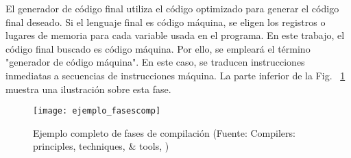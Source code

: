     El generador de código final utiliza el código optimizado para generar el código final deseado.
    Si el lenguaje final es código máquina, se eligen los registros o lugares de memoria para
    cada variable usada en el programa. 
    En este trabajo, el código final buscado es código máquina. Por ello, se empleará el término "generador de código máquina".
    En este caso, se traducen instrucciones inmediatas a secuencias de instrucciones máquina.
    La parte inferior de la Fig. ~\ref{fig:fasesEjemplo} muestra una ilustración sobre esta fase.

    \begin{figure}[p]
        \begingroup
            \centering
                \texttt{[image: ejemplo\_fasescomp]}
                \caption{Ejemplo completo de fases de compilación (Fuente: Compilers: principles, techniques, \& tools, \cite{aho_compilers:_2007}) }
                \label{fig:fasesEjemplo}
            \par
        \endgroup
    \end{figure}

